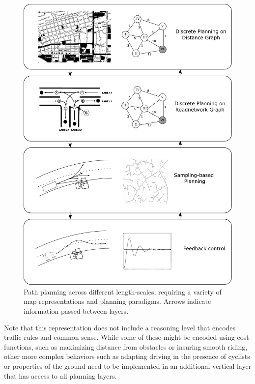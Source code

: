 \begin{figure}
    \centering
    \includegraphics[width=\textwidth]{figs/planninglayers.pdf}
    \caption{Path planning across different length-scales, requiring a variety of map representations and planning paradigms. Arrows indicate information passed between layers.\label{fig:planninglayers}}
\end{figure}

Note that this representation does not include a reasoning level that encodes traffic rules and common sense. While some of these might be encoded using cost-functions, such as maximizing distance from obstacles or insuring smooth riding, other more complex behaviors such as adapting driving in the presence of cyclists or properties of the ground need to be implemented in an additional vertical layer that has access to all planning layers.


